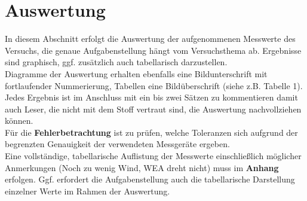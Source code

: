 \section{Auswertung}
In diesem Abschnitt erfolgt die Auswertung der aufgenommenen Messwerte des Versuchs, die genaue Aufgabenstellung hängt vom Versuchsthema ab. Ergebnisse sind graphisch, ggf. zusätzlich auch tabellarisch darzustellen.\\

Diagramme der Auswertung erhalten ebenfalls eine Bildunterschrift mit fortlaufender Nummerierung, Tabellen eine Bildüberschrift (siehe z.B. Tabelle 1). Jedes Ergebnis ist im Anschluss mit ein bis zwei Sätzen zu kommentieren damit auch Leser, die nicht mit dem Stoff vertraut sind, die Auswertung nachvollziehen können.\\

Für die \textbf{Fehlerbetrachtung} ist zu prüfen, welche Toleranzen sich aufgrund der begrenzten Genauigkeit der verwendeten Messgeräte ergeben.\\

Eine vollständige, tabellarische Auflistung der Messwerte einschließlich möglicher Anmerkungen (\glqq Noch zu wenig Wind, WEA dreht nicht\grqq{}) muss im \textbf{Anhang} erfolgen. Ggf. erfordert die Aufgabenstellung auch die tabellarische Darstellung einzelner Werte im Rahmen der Auswertung.\\

